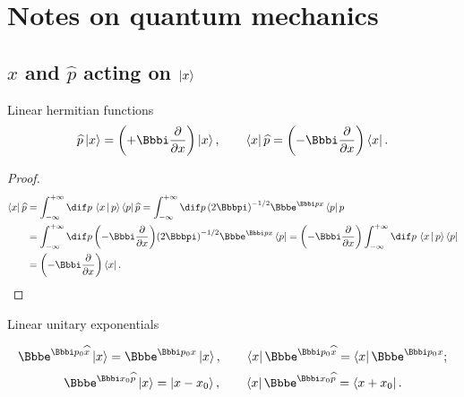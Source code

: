 \section{Notes on quantum mechanics}

\subsection{$\widehat{x}$ and $\widehat{p}$ acting on $\Ket{x}$}

\begin{namedthm}{Linear hermitian functions}
\begin{equation}
	\widehat{p} \Ket{x} = \rbr{+\ii \frpa{}{x}} \Ket{x},\qquad
	\Bra{x} \widehat{p} = \rbr{-\ii \frpa{}{x}} \Bra{x}.
\end{equation}

\end{namedthm} %
\begin{proof}
\begin{align}
\Bra{x} \widehat{p} &= \int_{-\infty}^{+\infty}\dif p\,\Braket{x | p}
\Bra{p} \widehat{p} 
= \int_{-\infty}^{+\infty}\dif p\,\rbr{2\pp}^{-1/2}\ee^{\ii p x}
\Bra{p} p \nonumber \\
&= \int_{-\infty}^{+\infty}\dif p\,
\rbr{-\ii \frpa{}{x}} \rbr{2\pp}^{-1/2} \ee^{\ii p x} \Bra{p}
= \rbr{-\ii \frpa{}{x}} \int_{-\infty}^{+\infty}\dif p\,
\Braket{x | p} \Bra{p} \nonumber \\
&= \rbr{-\ii \frpa{}{x}} \Bra{x}.
\end{align}
\end{proof}

\begin{namedthm}{Linear unitary exponentials}

\begin{equation}
\ee^{\ii p_0 \widehat{x}} \Ket{x} = \ee^{\ii p_0 x} \Ket{x},
\qquad
\Bra{x} \ee^{\ii p_0 \widehat{x}} = \Bra{x} \ee^{\ii p_0 x};
\end{equation}
\begin{equation}
\ee^{\ii x_0 \widehat{p}} \Ket{x} = \Ket{x-x_0},\qquad
\Bra{x} \ee^{\ii x_0 \widehat{p}} = \Bra{x+x_0}.
\end{equation}

\end{namedthm} %


